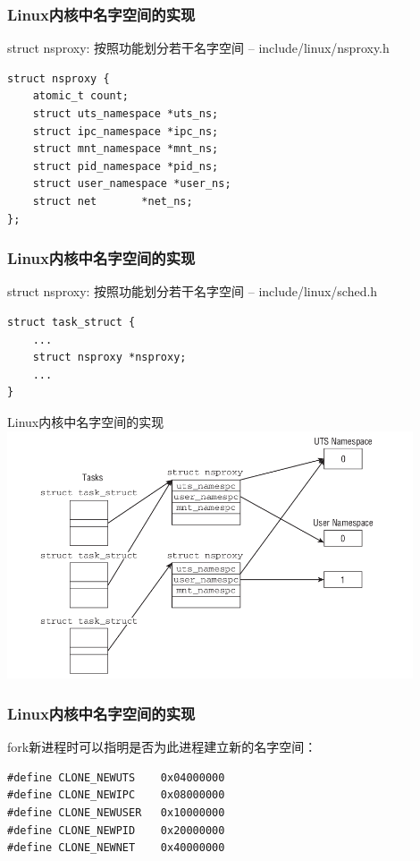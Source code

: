 \documentclass[xcolor=svgnames]{beamer}
\begin{document}
\begin{CJK*}{UTF8}{gbsn}
\begin{frame}[fragile]
\frametitle{Linux内核中名字空间的实现}
\begin{block}{struct nsproxy: 按照功能划分若干名字空间 -- include/linux/nsproxy.h}
\begin{verbatim}
struct nsproxy {
    atomic_t count;
    struct uts_namespace *uts_ns;
    struct ipc_namespace *ipc_ns;
    struct mnt_namespace *mnt_ns;
    struct pid_namespace *pid_ns;
    struct user_namespace *user_ns;
    struct net       *net_ns;
};
\end{verbatim}
\end{block}
\end{frame}

\begin{frame}[fragile]
\frametitle{Linux内核中名字空间的实现}
\begin{block}{struct nsproxy: 按照功能划分若干名字空间 -- include/linux/sched.h}
\begin{verbatim}
struct task_struct {
    ...
    struct nsproxy *nsproxy;
    ...
}
\end{verbatim}
\end{block}
\end{frame}

\begin{frame}{Linux内核中名字空间的实现}
\includegraphics[width=0.9\textwidth]{ns_impl.png}
\end{frame}

\begin{frame}[fragile]
\frametitle{Linux内核中名字空间的实现}
\begin{block}{fork新进程时可以指明是否为此进程建立新的名字空间：}
\begin{verbatim}
#define CLONE_NEWUTS    0x04000000  
#define CLONE_NEWIPC    0x08000000 
#define CLONE_NEWUSER   0x10000000
#define CLONE_NEWPID    0x20000000
#define CLONE_NEWNET    0x40000000 
\end{verbatim}
\end{block}
\end{frame}


\end{CJK*}
\end{document}
